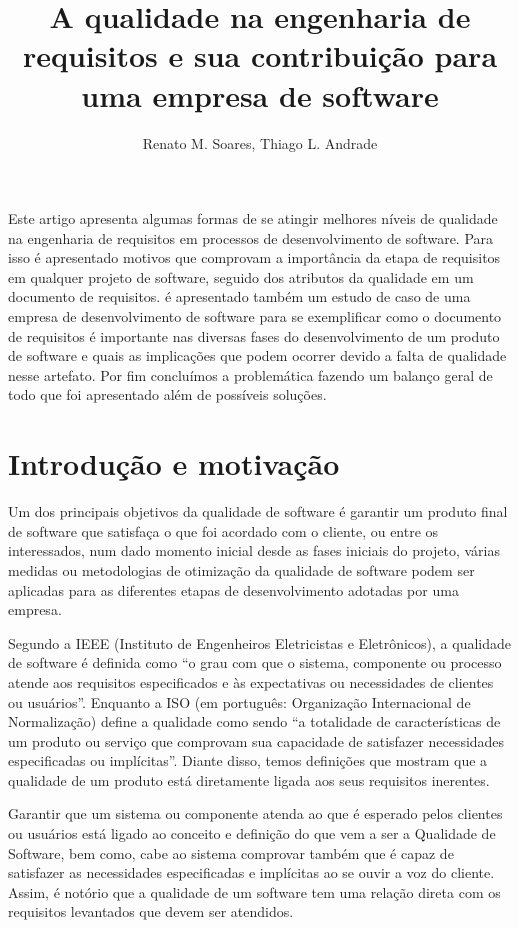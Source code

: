 \documentclass[12pt]{article}
\title{A qualidade na engenharia de requisitos e sua contribuição para uma empresa de software}
\author{Renato M. Soares, Thiago L. Andrade}
\begin{document}
 

\maketitle
     
\begin{resumo} 
Este artigo apresenta algumas formas de se atingir melhores níveis de qualidade na 
engenharia de requisitos em processos de desenvolvimento de software. Para isso é 
apresentado motivos que comprovam a importância da etapa de requisitos em qualquer 
projeto de software, seguido dos atributos da qualidade em um documento de 
requisitos. é apresentado também um estudo de caso de uma empresa de desenvolvimento 
de software para se exemplificar como o documento de requisitos é importante nas 
diversas fases do desenvolvimento de um produto de software e quais as implicações 
que podem ocorrer devido a falta de qualidade nesse artefato. Por fim concluímos a 
problemática fazendo um balanço geral de todo que foi apresentado além de 
possíveis soluções.
\end{resumo}

\section{Introdução e motivação}
Um dos principais objetivos da qualidade de software é garantir um produto final 
de software que satisfaça o que foi acordado com o cliente, ou entre os interessados, 
num dado momento inicial desde as fases iniciais do projeto, várias medidas ou 
metodologias de otimização da qualidade de software podem ser aplicadas para as 
diferentes etapas de desenvolvimento adotadas por uma empresa.

Segundo a IEEE (Instituto de Engenheiros Eletricistas e Eletrônicos), a qualidade 
de software é definida como “o grau com que o sistema, componente ou processo atende 
aos requisitos especificados e às expectativas ou necessidades de clientes ou usuários”. 
Enquanto a ISO (em português: Organização Internacional de Normalização) define a 
qualidade como sendo “a totalidade de características de um produto ou serviço que 
comprovam sua capacidade de satisfazer necessidades especificadas ou implícitas”. 
Diante disso, temos definições que mostram que a qualidade de um produto está diretamente 
ligada aos seus requisitos inerentes.

Garantir que um sistema ou componente atenda ao que é esperado pelos clientes ou 
usuários está ligado ao conceito e definição do que vem a ser a Qualidade de Software, 
bem como, cabe ao sistema comprovar também que é capaz de satisfazer as necessidades 
especificadas e implícitas ao se ouvir a voz do cliente. Assim, é notório que a qualidade 
de um software tem uma relação direta com os requisitos levantados que devem ser atendidos.
\end{document}

